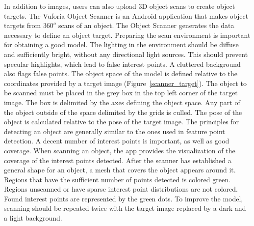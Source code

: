 In addition to images, users can also upload 3D object scans to create object targets. The Vuforia Object Scanner is an Android application that makes object targets from $360^o$ scans of an object. The Object Scanner generates the data necessary to define an object target. Preparing the scan environment is important for obtaining a good model. The lighting in the environment should be diffuse and sufficiently bright, without any directional light sources. This should prevent specular highlights, which lead to false interest points. A cluttered background also flags false points. The object space of the model is defined relative to the coordinates provided by a target image (Figure~\ref{scanner_target}). The object to be scanned must be placed in the grey box in the top left corner of the target image. The box is delimited by the axes defining the object space. Any part of the object outside of the space delimited by the grids is culled. The pose of the object is calculated relative to the pose of the target image. The principles for detecting an object are generally similar to the ones used in feature point detection. A decent number of interest points is important, as well as good coverage. When scanning an object, the app provides the visualization of the coverage of the interest points detected. After the scanner has established a general shape for an object, a mesh that covers the object appears around it. Regions that have the sufficient number of points detected is colored green. Regions unscanned or have sparse interest point distributions are not colored. Found interest points are represented by the green dots. To improve the model, scanning should be repeated twice with the target image replaced by a dark and a light background.

\begin{figure}[!ht]
\end{figure}

\begin{figure}[!ht]
\end{figure}

